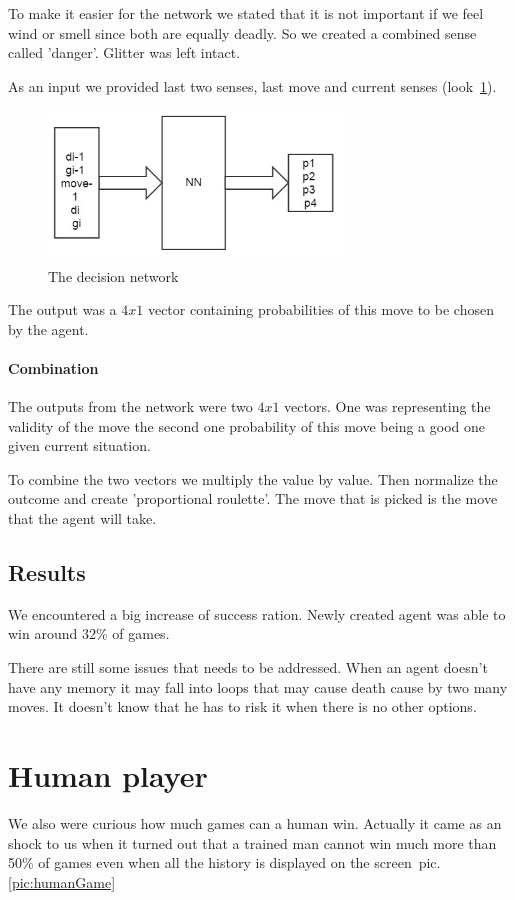 \documentclass[a4paper]{article}
\begin{document}
To make it easier for the network we stated that it is not important if we feel wind or smell since both are equally deadly. So we created a combined sense called 'danger'. Glitter was left intact.

As an input we provided last two senses, last move and current senses (look~\ref{pic:decionMoves}).

\begin{figure}[!h]
		\centering	
		\includegraphics[width=0.7\textwidth]{pic/decisionNet.jpg}
		\caption{The decision network}
		\label{pic:decionMoves}
	\end{figure}

The output was a $4x1$ vector containing probabilities of this move to be chosen by the agent.

\paragraph{Combination}
	The outputs from the network were two $4x1$ vectors. One was representing the validity of the move the second one probability of this move being a good one given current situation.
	
	To combine the two vectors we multiply the value by value. Then normalize the outcome and create 'proportional roulette'. The move that is picked is the move that the agent will take.  

\subsection{Results}
	We encountered a big increase of success ration. Newly created agent was able to win around $32\%$ of games. 
	
	There are still some issues that needs to be addressed.	When an agent doesn't have any memory it may fall into loops that may cause death cause by two many moves. It doesn't know that he has to risk it when there is no other options.

\section{Human player}
We also were curious how much games can a human win. Actually it came as an shock to us when it turned out that a trained man cannot win much more than 50\% of games even when all the history is displayed on the screen~pic.\ref{pic:humanGame}
\end{document}
